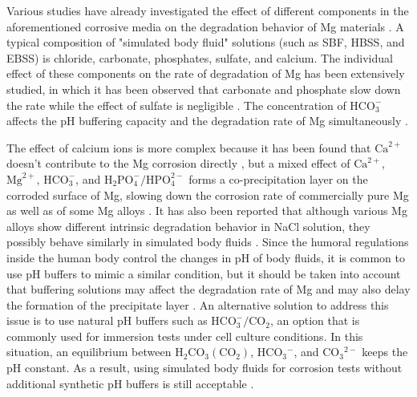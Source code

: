 Various studies have already investigated the effect of different components in the aforementioned corrosive media on the degradation behavior of Mg materials \cite{Mei2019,Zeng2014,Johnston2017, Lamaka2018,Mei2019a}. A typical composition of "simulated body fluid" solutions (such as \gls{SBF}, \gls{HBSS}, and \gls{EBSS}) is chloride, carbonate, phosphates, sulfate, and calcium. The individual effect of these components on the rate of degradation of Mg has been extensively studied, in which it has been observed that carbonate and phosphate slow down the rate while the effect of sulfate is negligible \cite{Johnston2017,Mei2019a}. The concentration of $\mathrm{HCO}_{3}^{-}$ affects the pH buffering capacity and the degradation rate of Mg simultaneously \cite{Xin2011}.

The effect of calcium ions is more complex because it has been found that $\mathrm{Ca}^{2+}$ doesn't contribute to the Mg corrosion directly \cite{Willumeit-Roemer2019}, but a mixed effect of $\mathrm{Ca}^{2+}$, $\mathrm{Mg}^{2+}$, $\mathrm{HCO}_{3}^{-}$, and $\mathrm{H}_{2} \mathrm{PO}_{4}^{-} / \mathrm{HPO}_{4}^{2-}$ forms a co-precipitation layer on the corroded surface of Mg, slowing down the corrosion rate of commercially pure Mg as well as of some Mg alloys \cite{Mei2019,Lamaka2018}. It has also been reported that although various Mg alloys show different intrinsic degradation behavior in NaCl solution, they possibly behave similarly in simulated body fluids \cite{Agha2016,Mei2019a}. Since the humoral regulations inside the human body control the changes in pH of body fluids, it is common to use pH buffers to mimic a similar condition, but it should be taken into account that buffering solutions may affect the degradation rate of Mg \cite{Cui2017,Kannan2017} and may also delay the formation of the precipitate layer \cite{Lamaka2018}. An alternative solution to address this issue is to use natural pH buffers such as $\mathrm{HCO}_{3}^{-}/\mathrm{CO}_{2}$, an option that is commonly used for immersion tests under cell culture conditions. In this situation, an equilibrium between $\mathrm{H}_{2} \mathrm{CO}_{3}\left(\mathrm{CO}_{2}\right)$, $\mathrm{HCO}_{3}{ }^{-}$, and $\mathrm{CO}_{3}{ }^{2-}$ keeps the pH constant. As a result, using simulated body fluids for corrosion tests without additional synthetic pH buffers is still acceptable \cite{Lamaka2018,Mei2019a}.

